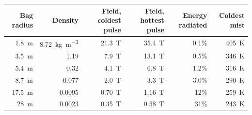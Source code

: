 \documentclass{article}
\begin{document}
\begin{table}[!htpb]
\begin{tabular}{|r|r|r|r|r|r|}
        \textbf{Bag radius} & \textbf{Density} & \textbf{Field, coldest pulse} & \textbf{Field, hottest pulse} & \textbf{Energy radiated} & \textbf{Coldest mist} \\\hline
        \SI{1.8}{\meter} & \SI{8.72}{\kilogram\per\cubic\meter} & \SI{21.3}{\tesla} & \SI{35.4}{\tesla} & 0.1\% & \SI{405}{\kelvin} \\\hline
        \SI{3.5}{\meter} & \num{1.19} & \SI{7.9}{\tesla} & \SI{13.1}{\tesla} & 0.5\% & \SI{346}{\kelvin} \\\hline
        \SI{5.4}{\meter} & \num{0.32} & \SI{4.1}{\tesla} & \SI{6.8}{\tesla} & 1.2\% & \SI{316}{\kelvin} \\\hline
        \SI{8.7}{\meter} & \num{0.077} & \SI{2.0}{\tesla} & \SI{3.3}{\tesla} & 3.0\% & \SI{290}{\kelvin} \\\hline
        \SI{17.5}{\meter} & \num{0.0095} & \SI{0.70}{\tesla} & \SI{1.16}{\tesla} & 12\% & \SI{259}{\kelvin} \\\hline
        \SI{28}{\meter} & \num{0.0023} & \SI{0.35}{\tesla} & \SI{0.58}{\tesla} & 31\% & \SI{243}{\kelvin} \\\hline
    \end{tabular}
\end{table}
\end{document}

